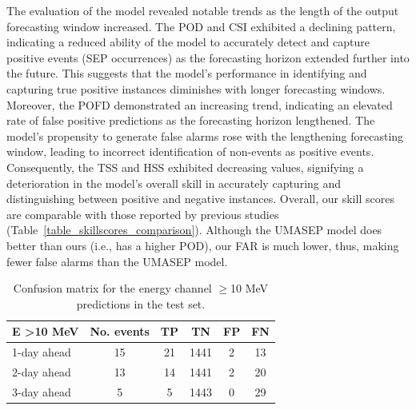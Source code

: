 The evaluation of the model revealed notable trends as the length of the output forecasting window increased. The POD and CSI exhibited a declining pattern, indicating a reduced ability of the model to accurately detect and capture positive events (SEP occurrences) as the forecasting horizon extended further into the future. This suggests that the model's performance in identifying and capturing true positive instances diminishes with longer forecasting windows. Moreover, the POFD demonstrated an increasing trend, indicating an elevated rate of false positive predictions as the forecasting horizon lengthened. The model's propensity to generate false alarms rose with the lengthening forecasting window, leading to incorrect identification of non-events as positive events. Consequently, the TSS and HSS exhibited decreasing values, signifying a deterioration in the model's overall skill in accurately capturing and distinguishing between positive and negative instances. Overall, our skill scores are comparable with those reported by previous studies (Table~\ref{table_skillscores_comparison}). Although the UMASEP model does better than ours (i.e., has a higher POD), our FAR is much lower, thus, making fewer false alarms than the UMASEP model.

\begin{table}[htp]
\centering
\caption{Confusion matrix for the energy channel $\geq$10 MeV predictions in the test set.}
\label{table_skillscores}
\begin{tabular}{lccccc}
	\hline
	\bf{E \textgreater{}10 MeV} & \bf{No. events} & \bf{TP} & \bf{TN} & \bf{FP} & \bf{FN} \\ \hline
	1-day ahead            & 15         & 21 & 1441 & 2  & 13 \\ \hline
	2-day ahead            & 13         & 14 & 1441 & 2  & 20 \\ \hline
	3-day ahead            & 5          & 5  & 1443 & 0  & 29 \\ \hline
	\end{tabular}
\end{table}

